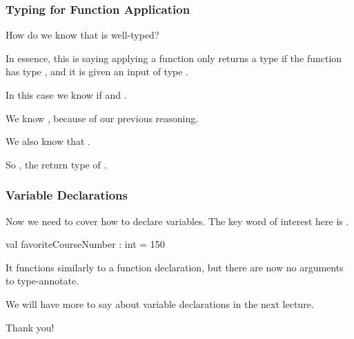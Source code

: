 \documentclass[aspectratio=169]{beamer}
\begin{document}
\begin{frame}[fragile]
  \frametitle{Typing for Function Application}

  How do we know that  is well-typed?

  \pause
  \vspace{\fill}


   \pause
  \vspace{\fill}

  In essence, this is saying applying a function only returns a type  if
  the function has type , and it is given an input of type .

  \pause
  \vspace{\fill}

  In this case we know  if  and .

  \pause
  \vspace{3pt}

  We know , because of our previous reasoning. 

  \pause
  \vspace{3pt}

  We also know that .

  \pause
  \vspace{\fill}

  So , the return type of .
\end{frame}

\begin{frame}[fragile]
  \frametitle{Variable Declarations}

  Now we need to cover how to declare variables. The key word of interest here is
  .
  
  \vspace{\fill}

  \begin{codeblock}
    val favoriteCourseNumber : int = 150
  \end{codeblock}

  \pause
  \vspace{\fill}

  It functions similarly to a function declaration, but there are now no arguments
  to type-annotate.

  \pause
  \vspace{\fill}

  We will have more to say about variable declarations in the next lecture.
\end{frame}

\begin{frame}[plain]
	\begin{center} Thank you! \end{center}
\end{frame}
\end{document}
